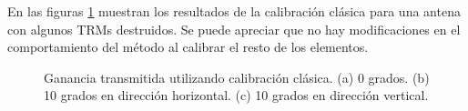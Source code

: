 En las figuras \ref{fig:deadTRMsClassical} muestran los resultados de la calibración clásica para una antena con algunos TRMs destruidos. 
Se puede apreciar que no hay modificaciones en el comportamiento del método al calibrar el resto de los elementos.
\begin{figure}[H]
	\centering
 	
		\caption{Ganancia transmitida utilizando calibración clásica. (a) 0 grados. (b) 10 grados en 
		dirección horizontal. (c) 10 grados en dirección vertical.}
	\label{fig:deadTRMsClassical}
\end{figure}
